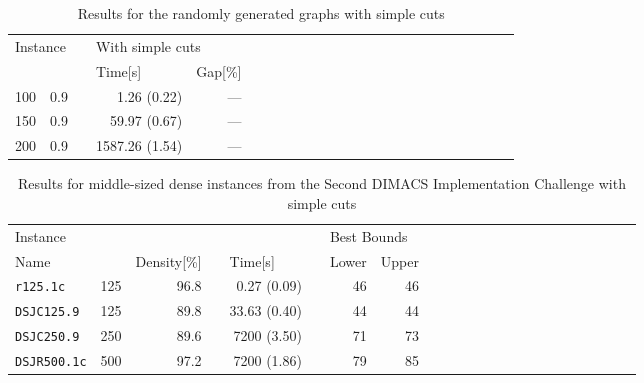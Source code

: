 \documentclass[11pt,a4paper]{article}
\begin{document}
\begin{table}[tb]
\caption{Results for the randomly generated graphs with simple cuts \label{tbl:middleRandCuts}}
\begin{center}
{\small
\begin{tabular}{rrrrrrrrrrrrrrrrrrrrrrrr}														
\toprule													
\multicolumn{2}{l}{Instance}			&&	\multicolumn{2}{l}{With simple cuts}	\\	\cline{1-2} \cline{4-5}
\multicolumn{1}{c}{}	&	\multicolumn{1}{c}{}	&&	\multicolumn{1}{l}{Time[s]}	&	\multicolumn{1}{l}{Gap[\%]}	\\
\midrule														
100	&	0.9	&&	1.26	(0.22)		&	---\\	
150	&	0.9	&&	59.97 (0.67)		&	---\\	
200	&	0.9	&&	1587.26 (1.54)		&	---\\
\bottomrule					
\end{tabular}	
}													
\end{center}
\end{table}

\begin{table}[tb]
\caption{Results for middle-sized dense instances from the Second DIMACS Implementation Challenge with simple cuts \label{tbl:middleDMCSCuts}}
\begin{center}
{\small
\begin{tabular}{lrrrrrrrrrrrrrrrrrrrrrr}
\toprule
\multicolumn{3}{l}{Instance}	&&		&&\multicolumn{2}{l}{Best Bounds}		\\	\cline{1-3} \cline{7-8}
\multicolumn{1}{l}{Name}	&\multicolumn{1}{c}{}	&\multicolumn{1}{l}{Density[\%]}
&&\multicolumn{1}{l}{Time[s]}
&&Lower	&Upper	\\
\midrule
\texttt{r125.1c}		&	125	&96.8	&&	0.27 (0.09)			&&	46	&	46 	\\	
\texttt{DSJC125.9}	&	125	&89.8	&&	33.63	 (0.40)		&&	44	&	44 	\\	
\texttt{DSJC250.9}	&	250	&89.6	&&	7200 (3.50)		&&	71 	&	73 	\\	
\texttt{DSJR500.1c}	&	500	&97.2	&&	7200 (1.86)		&&	79	&	85 	\\
\bottomrule
\end{tabular}
}
\end{center}
\end{table}
\end{document}
